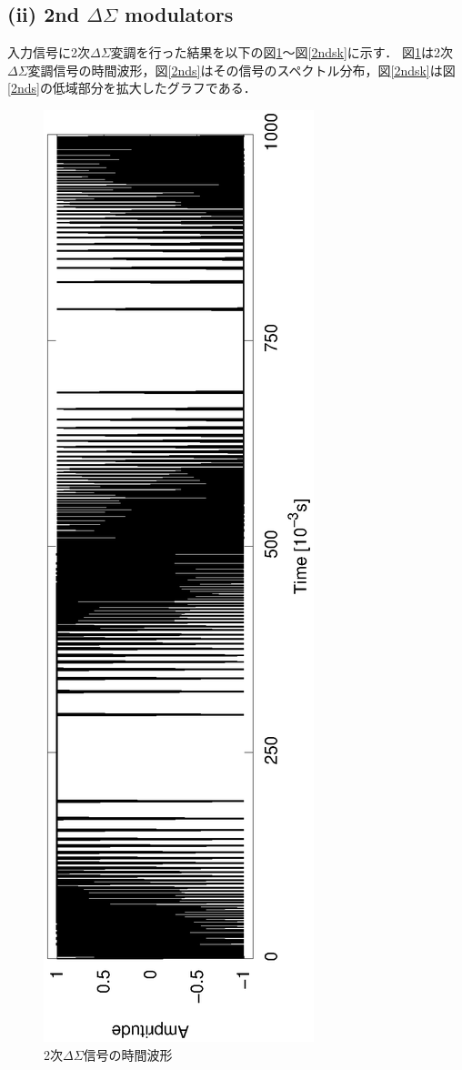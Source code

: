 \documentclass[a4j]{jsarticle}
\begin{document}
%
\subsection*{(ii) 2nd $\Delta\Sigma$ modulators}
入力信号に2次$\Delta\Sigma$変調を行った結果を以下の図\ref{2ndt}〜図\ref{2ndsk}に示す．
図\ref{2ndt}は2次$\Delta\Sigma$変調信号の時間波形，図\ref{2nds}はその信号のスペクトル分布，図\ref{2ndsk}は図\ref{2nds}の低域部分を拡大したグラフである．

\begin{figure}[H]
 \centering
 \vspace{-3.5cm}
 \hspace{-2cm}
 \includegraphics[angle=-90,scale=0.6]{2ndout_time.eps}
 \vspace{-2.2cm}
 \caption{2次$\Delta\Sigma$信号の時間波形}
 \label{2ndt}
\end{figure}
\vspace{-5mm}
\end{document}
